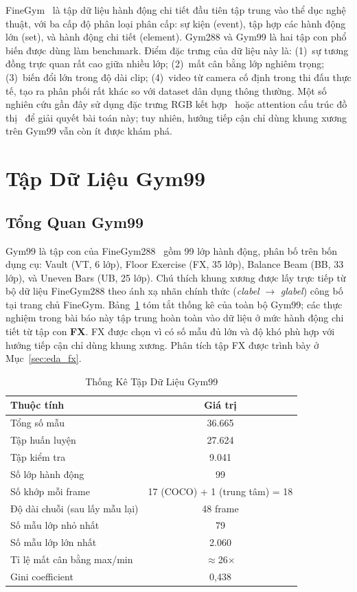 \documentclass[conference]{IEEEtran}
\begin{document}
FineGym~\cite{shao2020finegym} là tập dữ liệu hành động chi tiết đầu
tiên tập trung vào thể dục nghệ thuật, với ba cấp độ phân loại phân
cấp: sự kiện (event), tập hợp các hành động lớn (set), và hành động chi tiết (element). Gym288
và Gym99 là hai tập con phổ biến được dùng làm benchmark. Điểm đặc
trưng của dữ liệu này là: (1)~sự tương đồng trực quan rất cao giữa
nhiều lớp; (2)~mất cân bằng lớp nghiêm trọng; (3)~biến đổi lớn trong
độ dài clip; (4)~video từ camera cố định trong thi đấu thực tế, tạo ra
phân phối rất khác so với dataset dân dụng thông thường. Một số nghiên
cứu gần đây sử dụng đặc trưng RGB kết hợp~\cite{shao2020finegym} hoặc
attention cấu trúc đồ thị~\cite{zhou2023learning} để giải quyết bài
toán này; tuy nhiên, hướng tiếp cận chỉ dùng khung xương trên Gym99
vẫn còn ít được khám phá.

\section{Tập Dữ Liệu Gym99}
\label{sec:dataset}

\subsection{Tổng Quan Gym99}

Gym99 là tập con của FineGym288~\cite{shao2020finegym} gồm 99 lớp hành
động, phân bố trên bốn dụng cụ: Vault (VT, 6 lớp), Floor Exercise
(FX, 35 lớp), Balance Beam (BB, 33 lớp), và Uneven Bars (UB, 25 lớp).
Chú thích khung xương được lấy trực tiếp từ bộ dữ liệu FineGym288 theo
ánh xạ nhãn chính thức (\textit{clabel} $\to$ \textit{glabel}) công bố
tại trang chủ FineGym. Bảng~\ref{tab:gym99_stats} tóm tắt thống kê của
toàn bộ Gym99; các thực nghiệm trong bài báo này tập trung hoàn toàn
vào dữ liệu ở mức hành động chi tiết từ tập con \textbf{FX}. FX được chọn vì có số mẫu 
đủ lớn và độ khó phù hợp với hướng tiếp cận chỉ dùng khung xương. Phân tích tập FX được trình bày ở Mục~\ref{sec:eda_fx}.

\begin{table}[!t]
\caption{Thống Kê Tập Dữ Liệu Gym99}
\label{tab:gym99_stats}
\centering
\begin{tabular}{lc}
\toprule
Thuộc tính & Giá trị \\
\midrule
Tổng số mẫu             & 36.665 \\
Tập huấn luyện          & 27.624 \\
Tập kiểm tra            & 9.041  \\
Số lớp hành động        & 99     \\
Số khớp mỗi frame       & 17 (COCO) + 1 (trung tâm) = 18 \\
Độ dài chuỗi (sau lấy mẫu lại) & 48 frame \\
Số mẫu lớp nhỏ nhất     & 79     \\
Số mẫu lớp lớn nhất     & 2.060  \\
Tỉ lệ mất cân bằng max/min & $\approx$26$\times$ \\
Gini coefficient        & 0,438  \\
\bottomrule
\end{tabular}
\end{table}
\end{document}
